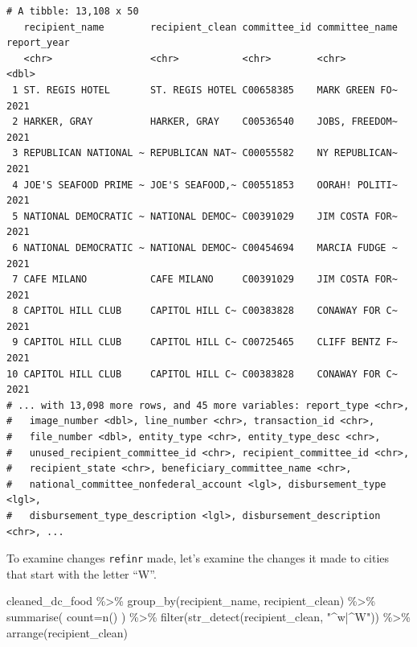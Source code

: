 \documentclass[
  letterpaper,
  DIV=11,
  numbers=noendperiod]{scrreprt}
\newenvironment{Shaded}{\begin{snugshade}}{\end{snugshade}}
\newcommand{\AttributeTok}[1]{\textcolor[rgb]{0.40,0.45,0.13}{#1}}
\newcommand{\FunctionTok}[1]{\textcolor[rgb]{0.28,0.35,0.67}{#1}}
\newcommand{\NormalTok}[1]{\textcolor[rgb]{0.00,0.23,0.31}{#1}}
\newcommand{\SpecialCharTok}[1]{\textcolor[rgb]{0.37,0.37,0.37}{#1}}
\newcommand{\StringTok}[1]{\textcolor[rgb]{0.13,0.47,0.30}{#1}}
\begin{document}
\begin{verbatim}
# A tibble: 13,108 x 50
   recipient_name        recipient_clean committee_id committee_name report_year
   <chr>                 <chr>           <chr>        <chr>                <dbl>
 1 ST. REGIS HOTEL       ST. REGIS HOTEL C00658385    MARK GREEN FO~        2021
 2 HARKER, GRAY          HARKER, GRAY    C00536540    JOBS, FREEDOM~        2021
 3 REPUBLICAN NATIONAL ~ REPUBLICAN NAT~ C00055582    NY REPUBLICAN~        2021
 4 JOE'S SEAFOOD PRIME ~ JOE'S SEAFOOD,~ C00551853    OORAH! POLITI~        2021
 5 NATIONAL DEMOCRATIC ~ NATIONAL DEMOC~ C00391029    JIM COSTA FOR~        2021
 6 NATIONAL DEMOCRATIC ~ NATIONAL DEMOC~ C00454694    MARCIA FUDGE ~        2021
 7 CAFE MILANO           CAFE MILANO     C00391029    JIM COSTA FOR~        2021
 8 CAPITOL HILL CLUB     CAPITOL HILL C~ C00383828    CONAWAY FOR C~        2021
 9 CAPITOL HILL CLUB     CAPITOL HILL C~ C00725465    CLIFF BENTZ F~        2021
10 CAPITOL HILL CLUB     CAPITOL HILL C~ C00383828    CONAWAY FOR C~        2021
# ... with 13,098 more rows, and 45 more variables: report_type <chr>,
#   image_number <dbl>, line_number <chr>, transaction_id <chr>,
#   file_number <dbl>, entity_type <chr>, entity_type_desc <chr>,
#   unused_recipient_committee_id <chr>, recipient_committee_id <chr>,
#   recipient_state <chr>, beneficiary_committee_name <chr>,
#   national_committee_nonfederal_account <lgl>, disbursement_type <lgl>,
#   disbursement_type_description <lgl>, disbursement_description <chr>, ...
\end{verbatim}

To examine changes \texttt{refinr} made, let's examine the changes it
made to cities that start with the letter ``W''.

\begin{Shaded}
\begin{Highlighting}[]
\NormalTok{cleaned\_dc\_food }\SpecialCharTok{\%\textgreater{}\%}
  \FunctionTok{group\_by}\NormalTok{(recipient\_name, recipient\_clean) }\SpecialCharTok{\%\textgreater{}\%}
  \FunctionTok{summarise}\NormalTok{(}
    \AttributeTok{count=}\FunctionTok{n}\NormalTok{()}
\NormalTok{  ) }\SpecialCharTok{\%\textgreater{}\%}
  \FunctionTok{filter}\NormalTok{(}\FunctionTok{str\_detect}\NormalTok{(recipient\_clean, }\StringTok{"\^{}w|\^{}W"}\NormalTok{)) }\SpecialCharTok{\%\textgreater{}\%}
  \FunctionTok{arrange}\NormalTok{(recipient\_clean)}
\end{Highlighting}
\end{Shaded}
\end{document}
